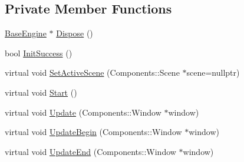 \subsection*{Private Member Functions}
\begin{DoxyCompactItemize}
\item 
\mbox{\hyperlink{classEngine_1_1BaseEngine_ad838c97afe1790cb35527f0b58e81e6b}{Base\+Engine}} $\ast$ \mbox{\hyperlink{classEngine_1_1BaseEngine_acd5cd5d2189d24e038b23477b7dce405}{Dispose}} ()
\item 
bool \mbox{\hyperlink{classEngine_1_1BaseEngine_a7a1c9b833049b3eb61194cab113dfe89}{Init\+Success}} ()
\item 
virtual void \mbox{\hyperlink{classEngine_1_1BaseEngine_afc82c6a00d5a9d4714740fc5eab5db86}{Set\+Active\+Scene}} (Components\+::\+Scene $\ast$scene=nullptr)
\item 
virtual void \mbox{\hyperlink{classEngine_1_1BaseEngine_a525fdc7a1da7eecb514ad5763f06be79}{Start}} ()
\item 
virtual void \mbox{\hyperlink{classEngine_1_1BaseEngine_a01c23c2073f08939a660f3b7a866852c}{Update}} (Components\+::\+Window $\ast$window)
\item 
virtual void \mbox{\hyperlink{classEngine_1_1BaseEngine_aace6be2a42d12b64fbd35f1acdb08408}{Update\+Begin}} (Components\+::\+Window $\ast$window)
\item 
virtual void \mbox{\hyperlink{classEngine_1_1BaseEngine_a7c07c98e583df042a0eb01e0ddec85a1}{Update\+End}} (Components\+::\+Window $\ast$window)
\end{DoxyCompactItemize}
